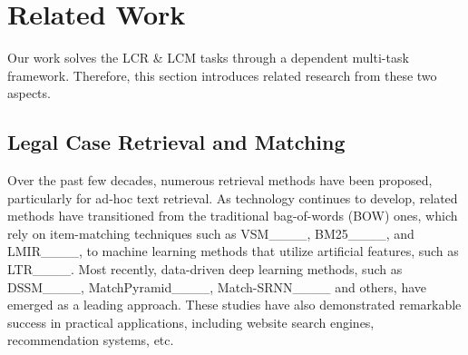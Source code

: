 \section{Related Work}
\label{sec:related_work}
Our work solves the LCR \& LCM tasks through a dependent multi-task framework.
Therefore, this section introduces related research from these two aspects.



\subsection{Legal Case Retrieval and Matching}
Over the past few decades, numerous retrieval methods have been proposed, particularly for ad-hoc text retrieval.
As technology continues to develop, related methods have transitioned from the traditional bag-of-words (BOW) ones, which rely on item-matching techniques such as VSM____, BM25____, and LMIR____, to machine learning methods that utilize artificial features, such as LTR____.
Most recently, data-driven deep learning methods, such as DSSM____, MatchPyramid____, Match-SRNN____ and others, have emerged as a leading approach.
These studies have also demonstrated remarkable success in practical applications, including website search engines, recommendation systems, etc.

